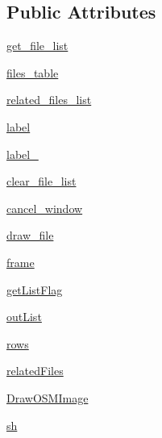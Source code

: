 \subsection*{Public Attributes}
\begin{DoxyCompactItemize}
\item 
\hyperlink{classsrc_1_1client_1_1gui_1_1draw__from__osm_1_1Ui__DrawFromOSMFile_a1ea9ea546c67ba714fdd27c932209ee4}{get\_\-file\_\-list}
\item 
\hyperlink{classsrc_1_1client_1_1gui_1_1draw__from__osm_1_1Ui__DrawFromOSMFile_ae63225916460fe015d1c24dbc2822a6f}{files\_\-table}
\item 
\hyperlink{classsrc_1_1client_1_1gui_1_1draw__from__osm_1_1Ui__DrawFromOSMFile_a611995437a7a8d234cffbf46d1151688}{related\_\-files\_\-list}
\item 
\hyperlink{classsrc_1_1client_1_1gui_1_1draw__from__osm_1_1Ui__DrawFromOSMFile_a89bbe9c1e11bc8f221d46062c2440f39}{label}
\item 
\hyperlink{classsrc_1_1client_1_1gui_1_1draw__from__osm_1_1Ui__DrawFromOSMFile_a93f13ac7df1337bcccb81c9c78fc015f}{label\_}
\item 
\hyperlink{classsrc_1_1client_1_1gui_1_1draw__from__osm_1_1Ui__DrawFromOSMFile_a25e2e970da65f31b27318be2020acc7f}{clear\_\-file\_\-list}
\item 
\hyperlink{classsrc_1_1client_1_1gui_1_1draw__from__osm_1_1Ui__DrawFromOSMFile_a87b5abfbdc3265d7863395957a70c14f}{cancel\_\-window}
\item 
\hyperlink{classsrc_1_1client_1_1gui_1_1draw__from__osm_1_1Ui__DrawFromOSMFile_a172ffdb3d791b00a1507086a6024b1cc}{draw\_\-file}
\item 
\hyperlink{classsrc_1_1client_1_1gui_1_1draw__from__osm_1_1Ui__DrawFromOSMFile_a2b383346d9948eae0f6f591ee408a51d}{frame}
\item 
\hyperlink{classsrc_1_1client_1_1gui_1_1draw__from__osm_1_1Ui__DrawFromOSMFile_a382540b3b753749e0074b8f59a5ab066}{getListFlag}
\item 
\hyperlink{classsrc_1_1client_1_1gui_1_1draw__from__osm_1_1Ui__DrawFromOSMFile_aff3e2f5fa68f1c0be36899157a780814}{outList}
\item 
\hyperlink{classsrc_1_1client_1_1gui_1_1draw__from__osm_1_1Ui__DrawFromOSMFile_a87e2ae629fc41791b3339ddcacaaa865}{rows}
\item 
\hyperlink{classsrc_1_1client_1_1gui_1_1draw__from__osm_1_1Ui__DrawFromOSMFile_a0c0ccb989d283bb515ba0c0ced9e27e2}{relatedFiles}
\item 
\hyperlink{classsrc_1_1client_1_1gui_1_1draw__from__osm_1_1Ui__DrawFromOSMFile_a0deb88911d8d35030698dc534f027d39}{DrawOSMImage}
\item 
\hyperlink{classsrc_1_1client_1_1gui_1_1draw__from__osm_1_1Ui__DrawFromOSMFile_aadcf45718a5155e20e20a4afc26fcaff}{sh}
\end{DoxyCompactItemize}


